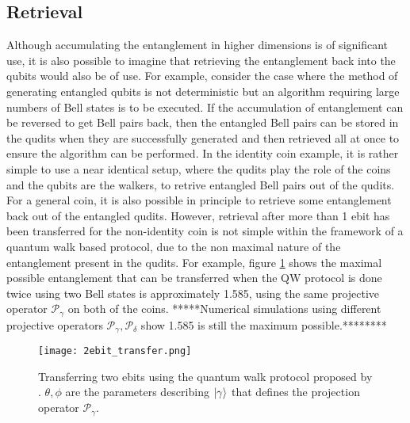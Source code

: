 \subsection{Retrieval}
\label{subsection:qw_retrieval}
Although accumulating the entanglement in higher dimensions is of significant use, it is also possible to imagine that retrieving the entanglement back into the qubits would also be of use.
For example, consider the case where the method of generating entangled qubits is not deterministic but an algorithm requiring large numbers of Bell states is to be executed.
If the accumulation of entanglement can be reversed to get Bell pairs back, then the entangled Bell pairs can be stored in the qudits when they are successfully generated and then retrieved all at once to ensure the algorithm can be performed.
In the identity coin example, it is rather simple to use a near identical setup, where the qudits play the role of the coins and the qubits are the walkers, to retrive entangled Bell pairs out of the qudits.
For a general coin, it is also possible in principle to retrieve some entanglement back out of the entangled qudits.
However, retrieval after more than 1 ebit has been transferred for the non-identity coin is not simple within the framework of a quantum walk based protocol, due to the non maximal nature of the entanglement present in the qudits.
For example, figure \ref{fig:2ebittransfer} shows the maximal possible entanglement that can be transferred when the QW protocol is done twice using two Bell states is approximately 1.585, using the same projective operator $\mathcal{P}_\gamma$ on both of the coins.
*****Numerical simulations using different projective operators $\mathcal{P}_\gamma, \mathcal{P}_\delta$ show 1.585 is still the maximum possible.********
\begin{figure}
    \centering
    \texttt{[image: 2ebit\_transfer.png]}
    \caption{Transferring two ebits using the quantum walk protocol proposed by \cite{giordani2020}. $\theta, \phi$ are the parameters describing $\ket{\gamma}$ that defines the projection operator $\mathcal{P}_\gamma$.}
    \label{fig:2ebittransfer}
\end{figure}